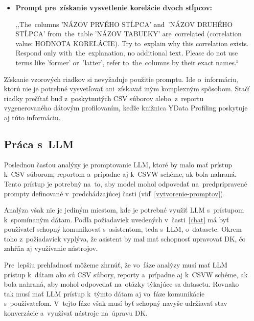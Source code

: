 \begin{itemize}
\item \textbf{Prompt pre~získanie vysvetlenie korelácie dvoch stĺpcov:}

,,The~columns '{NÁZOV PRVÉHO STĹPCA}' and~'{NÁZOV DRUHÉHO STĹPCA}' from~the~table '{NÁZOV TABUĽKY}' are~correlated (correlation value: {HODNOTA KORELÁCIE}). Try to~explain why this correlation exists. Respond only with~the~explanation, no additional text. Please do not use terms like 'former' or~'latter', refer to~the~columns by their exact names.``
\end{itemize}

Získanie vzorových riadkov si nevyžaduje použitie promptu. Ide o~informáciu, ktorú nie je potrebné vysvetľovať ani~získavať iným komplexným spôsobom. Stačí riadky prečítať buď z~poskytnutých CSV súborov alebo~z~reportu vygenerovaného dátovým profilovaním, keďže knižnica YData Profiling poskytuje aj túto informáciu.

\subsection{Práca s~LLM}

Poslednou časťou analýzy je promptovanie LLM, ktoré by malo mať prístup k~CSV súborom, reportom a~prípadne aj k~CSVW schéme, ak bola nahraná. Tento prístup je potrebný na~to, aby model mohol odpovedať na~predpripravené prompty definované v~predchádzajúcej časti (viď~\ref{vytvorenie-promptov}).

Analýza však nie je jediným miestom, kde je potrebné využiť LLM s~prístupom k~spomínaným dátam. Podľa požiadaviek uvedených v~časti~\ref{chat} má byť používateľ schopný komunikovať s~asistentom, teda s~LLM, o~datasete. Okrem toho z~požiadaviek vyplýva, že asistent by mal mať schopnosť upravovať DK, čo zahŕňa aj využívanie nástrojov.

Pre~lepšiu prehľadnosť môžeme zhrnúť, že vo~fáze analýzy musí mať LLM prístup k~dátam ako sú CSV súbory, reporty a~prípadne aj k~CSVW schéme, ak bola nahraná, aby mohol odpovedať na~otázky týkajúce sa datasetu. Rovnako tak musí mať LLM prístup k~týmto dátam aj vo~fáze komunikácie s~používateľom. V~tejto fáze však musí byť schopný navyše udržiavať stav konverzácie a~využívať nástroje na~úpravu DK.

